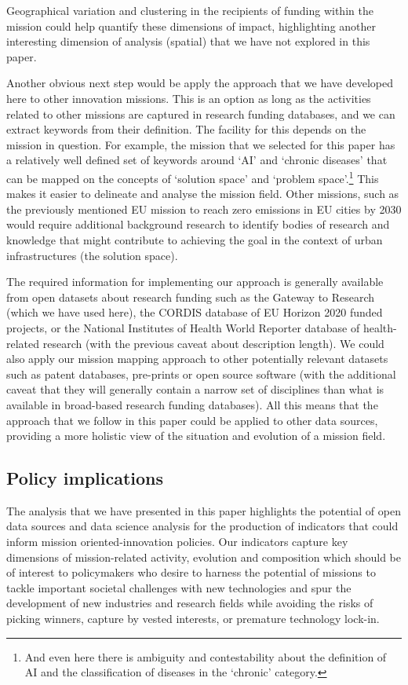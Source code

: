 \documentclass[11pt]{article}
\begin{document}
Geographical variation and clustering in the recipients of funding within the mission could help quantify these dimensions of impact, highlighting another interesting dimension of analysis (spatial) that we have not explored in this paper. 

Another obvious next step would be apply the approach that we have developed here to other innovation missions. This is an option as long as the activities related to other missions are captured in research funding databases, and we can extract keywords from their definition. The facility for this depends on the mission in question. For example, the mission that we selected for this paper has a relatively well defined set of keywords around `AI’ and `chronic diseases’ that can be mapped on the concepts of ‘solution space’ and ‘problem space’.\footnote{And even here there is ambiguity and contestability about the definition of AI and the classification of diseases in the `chronic' category.} This makes it easier to delineate and analyse the mission field. Other missions, such as the previously mentioned EU mission to reach zero emissions in EU cities by 2030 would require additional background research to identify bodies of research and knowledge that might contribute to achieving the goal in the context of urban infrastructures (the solution space).

The required information for implementing our approach is generally available from open datasets about research funding such as the Gateway to Research (which we have used here), the CORDIS database of EU Horizon 2020 funded projects, or the National Institutes of Health World Reporter database of health-related research (with the previous caveat about description length). We could also apply our mission mapping approach to other potentially relevant datasets such as patent databases, pre-prints or open source software (with the additional caveat that they will generally contain a narrow set of disciplines than what is available in broad-based research funding databases). All this means that the approach that we follow in this paper could be applied to other data sources, providing a more holistic view of the situation and evolution of a mission field.

\subsection{Policy implications}
The analysis that we have presented in this paper highlights the potential of open data sources and data science analysis for the production of indicators that could inform mission oriented-innovation policies. Our indicators capture key dimensions of mission-related activity, evolution and composition which should be of interest to policymakers who desire to harness the potential of missions to tackle important societal challenges with new technologies and spur the development of new industries and research fields while avoiding the risks of picking winners, capture by vested interests, or premature technology lock-in.
\end{document}
